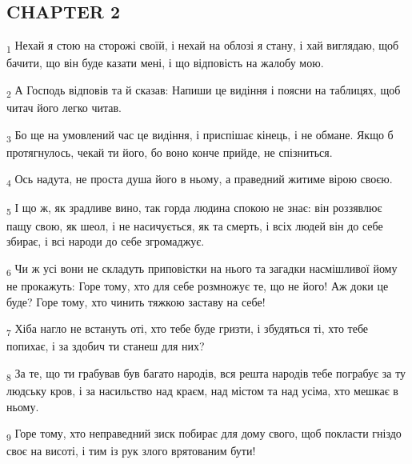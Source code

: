 \subsection{CHAPTER 2}
\begin{tcolorbox}
\textsubscript{1} Нехай я стою на сторожі своїй, і нехай на облозі я стану, і хай виглядаю, щоб бачити, що він буде казати мені, і що відповість на жалобу мою.
\end{tcolorbox}
\begin{tcolorbox}
\textsubscript{2} А Господь відповів та й сказав: Напиши це видіння і поясни на таблицях, щоб читач його легко читав.
\end{tcolorbox}
\begin{tcolorbox}
\textsubscript{3} Бо ще на умовлений час це видіння, і приспішає кінець, і не обмане. Якщо б протягнулось, чекай ти його, бо воно конче прийде, не спізниться.
\end{tcolorbox}
\begin{tcolorbox}
\textsubscript{4} Ось надута, не проста душа його в ньому, а праведний житиме вірою своєю.
\end{tcolorbox}
\begin{tcolorbox}
\textsubscript{5} І що ж, як зрадливе вино, так горда людина спокою не знає: він роззявлює пащу свою, як шеол, і не насичується, як та смерть, і всіх людей він до себе збирає, і всі народи до себе згромаджує.
\end{tcolorbox}
\begin{tcolorbox}
\textsubscript{6} Чи ж усі вони не складуть приповістки на нього та загадки насмішливої йому не прокажуть: Горе тому, хто для себе розмножує те, що не його! Аж доки це буде? Горе тому, хто чинить тяжкою заставу на себе!
\end{tcolorbox}
\begin{tcolorbox}
\textsubscript{7} Хіба нагло не встануть оті, хто тебе буде гризти, і збудяться ті, хто тебе попихає, і за здобич ти станеш для них?
\end{tcolorbox}
\begin{tcolorbox}
\textsubscript{8} За те, що ти грабував був багато народів, вся решта народів тебе пограбує за ту людську кров, і за насильство над краєм, над містом та над усіма, хто мешкає в ньому.
\end{tcolorbox}
\begin{tcolorbox}
\textsubscript{9} Горе тому, хто неправедний зиск побирає для дому свого, щоб покласти гніздо своє на висоті, і тим із рук злого врятованим бути!
\end{tcolorbox}
